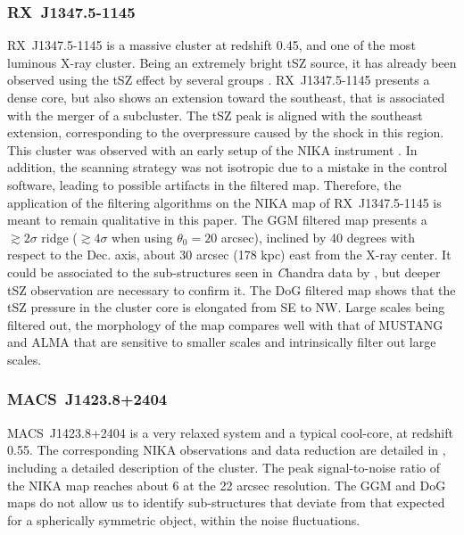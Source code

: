 \documentclass[twocolumn,traditabstract]{aa}
\begin{document}
\subsubsection{RX~J1347.5-1145}
\mbox{RX~J1347.5-1145} is a massive cluster at redshift 0.45, and one of the most luminous X-ray cluster. Being an extremely bright tSZ source, it has already been observed using the tSZ effect by several groups \citep[e.g.,][]{Pointecouteau1999,Komatsu1999,Mason2010,Plagge2012,Adam2014,Sayers2016,Kitayama2016}. \mbox{RX~J1347.5-1145} presents a dense core, but also shows an extension toward the southeast, that is associated with the merger of a subcluster. The tSZ peak is aligned with the southeast extension, corresponding to the overpressure caused by the shock in this region. This cluster was observed with an early setup of the NIKA instrument \citep[bandpass, sensitivity, calibration procedure, see][for more details]{Adam2014}. In addition, the scanning strategy was not isotropic due to a mistake in the control software, leading to possible artifacts in the filtered map. Therefore, the application of the filtering algorithms on the NIKA map of \mbox{RX~J1347.5-1145} is meant to remain qualitative in this paper. The GGM filtered map presents a $\gtrsim 2 \sigma$ ridge ($\gtrsim 4 \sigma$ when using $\theta_0 = 20$ arcsec), inclined by 40 degrees with respect to the Dec. axis, about 30 arcsec (178 kpc) east from the X-ray center. It could be associated to the sub-structures seen in {\textit Chandra} data by \cite{Kreisch2016}, but deeper tSZ observation are necessary to confirm it. The DoG filtered map shows that the tSZ pressure in the cluster core is elongated from SE to NW. Large scales being filtered out, the morphology of the map compares well with that of MUSTANG \citep{Mason2010} and ALMA \citep{Kitayama2016} that are sensitive to smaller scales and intrinsically filter out large scales.

\subsubsection{MACS~J1423.8+2404}
\mbox{MACS~J1423.8+2404} is a very relaxed system and a typical cool-core, at redshift 0.55. The corresponding NIKA observations and data reduction are detailed in \citep{Adam2016a}, including a detailed description of the cluster. The peak signal-to-noise ratio of the NIKA map reaches about 6 at the 22 arcsec resolution. The GGM and DoG maps do not allow us to identify sub-structures that deviate from that expected for a spherically symmetric object, within the noise fluctuations.
\end{document}
